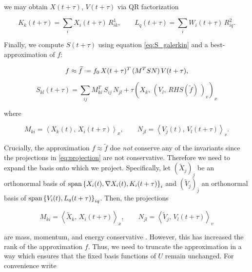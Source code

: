 we may obtain $X(t + \tau)$, $V(t + \tau)$ 
via QR factorization

\begin{equation}
    K_k (t + \tau) = \sum_i X_i (t + \tau)\, R^1_{i k}, \quad\quad
    L_q (t + \tau) = \sum_i W_i (t + \tau)\, R^2_{i q} . 
\end{equation}

Finally, we compute $S(t + \tau)$ using equation \ref{eq:S_galerkin} and a 
best-approximation of $f$:

\begin{equation}
    f \approx \widetilde{ f } \defeq f_0\, X(t + \tau)^T\, (M^T S N)\, V(t + \tau), 
\end{equation}

\begin{equation}\label{eq:S_step}
    S_{k l} (t + \tau) = \sum_{i j} M^T_{k i}\, S_{i j}\, N_{j l} 
        + \tau \left( X_k,\, \left( V_l,\, 
            RHS( \widetilde{ f } )\, 
        \right)_v \right)_x
\end{equation}

where 

\begin{equation}\label{eq:projection}
    M_{k i} = \left\langle X_k (t),\, X_i (t + \tau) \right\rangle_x, \quad\quad
    N_{j l} = \left\langle V_j (t),\, V_l (t + \tau) \right\rangle_v . 
\end{equation}

Crucially, the approximation $f \approx \widetilde{ f }$ doe \emph{not} conserve any of 
the invariants since the projections in \ref{eq:projection} are not conservative. 
Therefore we need to expand the basis onto which we project. Specifically, let 
$(\widetilde{ X }_j)_j$ be an orthonormal basis of 
$\text{span} \left\{ X_i (t), \nabla X_i (t), K_i (t + \tau) \right\}_i$ and 
$(\widetilde{ V }_j)_j$ an orthonormal basis of 
$\text{span} \left\{ V_i (t), L_q (t + \tau) \right\}_{i q}$. Then, the projections 

\begin{equation}\label{eq:conservative_projection}
    M_{k i} = \left\langle \widetilde{ X }_k,\, X_i (t + \tau) \right\rangle_x, \quad\quad
    N_{j l} = \left\langle \widetilde{ V }_j,\, V_l (t + \tau) \right\rangle_v 
\end{equation}

are mass, momentum, and energy conservative \cite{robustlowrank}. However, this has 
increased the rank of the approximation $f$. Thus, we need to truncate the approximation 
in a way which ensures that the fixed basis functions of $U$ remain unchanged. For 
convenience write 

